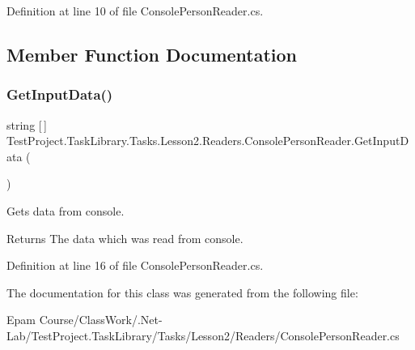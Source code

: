 Definition at line 10 of file Console\+Person\+Reader.\+cs.



\subsection{Member Function Documentation}
\mbox{\label{class_test_project_1_1_task_library_1_1_tasks_1_1_lesson2_1_1_readers_1_1_console_person_reader_ad696a3ae882b5ea4de839d84e64b774f}} 
\subsubsection{\texorpdfstring{GetInputData()}{GetInputData()}}
{\footnotesize\ttfamily string \mbox{[}$\,$\mbox{]} Test\+Project.\+Task\+Library.\+Tasks.\+Lesson2.\+Readers.\+Console\+Person\+Reader.\+Get\+Input\+Data (\begin{DoxyParamCaption}{ }\end{DoxyParamCaption})}



Gets data from console. 

\begin{DoxyReturn}{Returns}
The data which was read from console.
\end{DoxyReturn}


Definition at line 16 of file Console\+Person\+Reader.\+cs.



The documentation for this class was generated from the following file\+:\begin{DoxyCompactItemize}
\item 
Epam Course/\+Class\+Work/.\+Net-\/\+Lab/\+Test\+Project.\+Task\+Library/\+Tasks/\+Lesson2/\+Readers/Console\+Person\+Reader.\+cs\end{DoxyCompactItemize}
